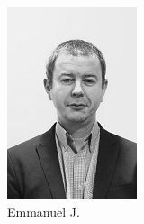 \begin{figure}[h!]
\begin{subfigure}[b]{0.2\textwidth}
                \includegraphics[width=\textwidth]{images/emmanuel-serieux.png}
                \caption{Emmanuel J.}
            \end{subfigure}
            \begin{subfigure}[b]{0.2\textwidth}

\end{subfigure}
\end{figure}
